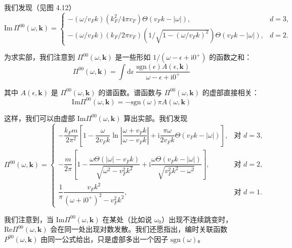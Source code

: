 我们发现（见图 4.12）
\begin{equation*}
\mathrm{Im}\,\Pi^{00}(\omega,\pmb{k})
= \left\{
\begin{array}{ll}
-(\omega/v_F k)\left(k_F^2/4\pi v_F\right)\Theta(v_F k-|\omega|), & d=3,\\[1ex]
-(\omega/v_F k)\left(k_F/2\pi v_F\right)\left(1/\sqrt{1-(\omega/v_F k)^2}\right)\Theta(v_F k-|\omega|), & d=2.
\end{array}
\right.
\end{equation*}

为求实部，我们注意到 $\Pi^{00}(\omega,\pmb{k})$ 是一些形如 $1/(\omega-\epsilon+\mathrm{i}0^{+})$ 的函数之和：
\begin{equation*}
\Pi^{00}(\omega,\pmb{k}) = \int \mathrm{d}\epsilon\; \frac{\mathrm{sgn}(\epsilon)A(\epsilon,\pmb{k})}{\omega-\epsilon+\mathrm{i}0^{+}}
\end{equation*}

其中 $A(\epsilon,\pmb{k})$ 是 $\Pi^{00}(\omega,\pmb{k})$ 的谱函数。谱函数与 $\Pi^{00}(\omega,\pmb{k})$ 的虚部直接相关：
\begin{equation*}
\mathrm{Im}\Pi^{00}(\omega,\pmb{k}) = -\mathrm{sgn}(\omega)\pi A(\omega,\pmb{k})
\end{equation*}

这样，我们可以由虚部 $\mathrm{Im}\Pi^{00}(\omega,\pmb{k})$ 算出实部。我们发现
\begin{equation*}
\Pi^{00}(\omega,\pmb{k})
= \left\{
\begin{array}{ll}
-\dfrac{k_F m}{2\pi^2}\left[1-\dfrac{\omega}{2v_F k}\ln\left|\dfrac{\omega+v_F k}{\omega-v_F k}\right|+\mathrm{i}\dfrac{\pi\omega}{2v_F k}\Theta(v_F k-|\omega|)\right], & \text{对 } d=3,\\[4ex]
-\dfrac{m}{2\pi}\left[1-\dfrac{\omega\Theta(|\omega|-v_F k)}{\sqrt{\omega^2-v_F^2k^2}}+\mathrm{i}\dfrac{\omega\Theta(v_F k-|\omega|)}{\sqrt{v_F^2k^2-\omega^2}}\right], & \text{对 } d=2,\\[4ex]
\dfrac{1}{\pi}\dfrac{v_F k^2}{(\omega+\mathrm{i}0^{+})^2-v_F^2k^2}, & \text{对 } d=1.
\end{array}
\right. \tag{4.3.2}
\end{equation*}

我们注意到，当 $\mathrm{Im}\Pi^{00}(\omega,\pmb{k})$ 在某处（比如说 $\omega_0$）出现不连续跳变时，$\mathrm{Re}\Pi^{00}(\omega,\pmb{k})$ 会在同一处出现对数发散。我们还愿指出，编时关联函数 $P^{00}(\omega,\pmb{k})$ 由同一公式给出，只是虚部多出一个因子 $\mathrm{sgn}(\omega)$。

